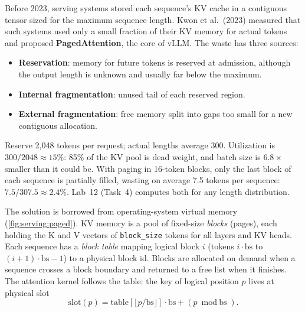 Before 2023, serving systems stored each sequence's KV cache in a contiguous tensor sized for the
maximum sequence length. Kwon et al.\ (2023) measured that such systems used only a small fraction
of their KV memory for actual tokens and proposed \textbf{PagedAttention}, the core of vLLM. The
waste has three sources:
\begin{itemize}
  \item \textbf{Reservation}: memory for future tokens is reserved at admission, although the output
    length is unknown and usually far below the maximum.
  \item \textbf{Internal fragmentation}: unused tail of each reserved region.
  \item \textbf{External fragmentation}: free memory split into gaps too small for a new contiguous
    allocation.
\end{itemize}

\begin{napkinmath}
Reserve 2,048 tokens per request; actual lengths average 300. Utilization is $300/2048\approx15\%$:
85\% of the KV pool is dead weight, and batch size is $6.8\times$ smaller than it could be. With paging
in 16-token blocks, only the last block of each sequence is partially filled, wasting on average 7.5
tokens per sequence: $7.5/307.5\approx2.4\%$. Lab~12 (Task~4) computes both for any length distribution.
\end{napkinmath}

The solution is borrowed from operating-system virtual memory (\cref{fig:serving:paged}). KV memory
is a pool of fixed-size \emph{blocks} (pages), each holding the K and V vectors of \texttt{block\_size}
tokens for all layers and KV heads. Each sequence has a \emph{block table} mapping logical block $i$
(tokens $i\cdot\text{bs}$ to $(i+1)\cdot\text{bs}-1$) to a physical block id. Blocks are allocated
on demand when a sequence crosses a block boundary and returned to a free list when it finishes. The
attention kernel follows the table: the key of logical position $p$ lives at physical slot
\begin{equation}\label{eq:serving:slot}
  \text{slot}(p) = \text{table}[\lfloor p/\text{bs}\rfloor]\cdot\text{bs} + (p \bmod \text{bs}).
\end{equation}


